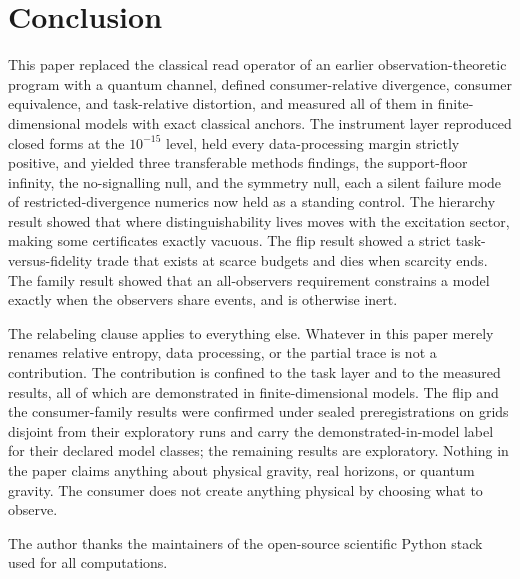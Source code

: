 \documentclass[aps,prd,reprint,nofootinbib,longbibliography]{revtex4-2}
\begin{document}
\section{Conclusion}
\label{sec:conclusion}

This paper replaced the classical read operator of an earlier
observation-theoretic program with a quantum channel, defined
consumer-relative divergence, consumer equivalence, and task-relative
distortion, and measured all of them in finite-dimensional models with
exact classical anchors.  The instrument layer reproduced closed forms at
the $10^{-15}$ level, held every data-processing margin strictly
positive, and yielded three transferable methods findings, the
support-floor infinity, the no-signalling null, and the symmetry null,
each a silent failure mode of restricted-divergence numerics now held as
a standing control.  The hierarchy result showed that where
distinguishability lives moves with the excitation sector, making some
certificates exactly vacuous.  The flip result showed a strict
task-versus-fidelity trade that exists at scarce budgets and dies when
scarcity ends.  The family result showed that an all-observers
requirement constrains a model exactly when the observers share events,
and is otherwise inert.

The relabeling clause applies to everything else.  Whatever in this paper
merely renames relative entropy, data processing, or the partial trace is
not a contribution.  The contribution is confined to the task layer and
to the measured results, all of which are demonstrated in
finite-dimensional models.  The flip and the consumer-family results
were confirmed under sealed preregistrations on grids disjoint from
their exploratory runs and carry the demonstrated-in-model label for
their declared model classes; the remaining results are exploratory.
Nothing in the paper claims anything about physical gravity, real
horizons, or quantum gravity.  The consumer does not create anything
physical by choosing what to observe.

\begin{acknowledgments}
The author thanks the maintainers of the open-source scientific Python
stack used for all computations.
\end{acknowledgments}
\end{document}
